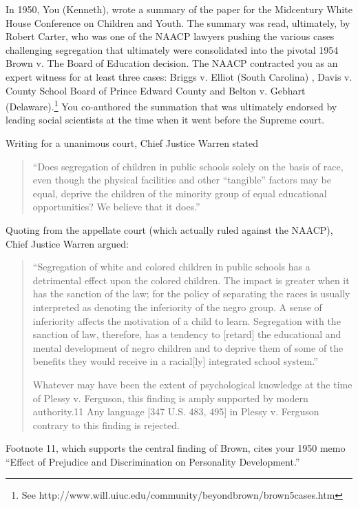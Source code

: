 \begin{refsection}
In 1950, You (Kenneth), wrote a summary of the paper for the Midcentury White House Conference on Children and Youth. The summary was read, ultimately, by Robert Carter, who was one of the NAACP lawyers pushing the various cases challenging segregation that ultimately were consolidated into the pivotal 1954 Brown v. The Board of Education decision. The NAACP contracted you as an expert witness for at least three cases: Briggs v. Elliot (South Carolina) , Davis v. County School Board of Prince Edward County and Belton v. Gebhart (Delaware).\footnote{See http:\slash \slash www.will.uiuc.edu\slash community\slash beyondbrown\slash brown5cases.htm} You co-authored the summation that was ultimately endorsed by leading social scientists at the time when it went before the Supreme court.

Writing for a unanimous court, Chief Justice Warren stated

\begin{quote}

“Does segregation of children in public schools solely on the basis of race, even though the physical facilities and other ``tangible'' factors may be equal, deprive the children of the minority group of equal educational opportunities? We believe that it does.”
\end{quote}

Quoting from the appellate court (which actually ruled against the NAACP), Chief Justice Warren argued:

\begin{quote}

``Segregation of white and colored children in public schools has a detrimental effect upon the colored children. The impact is greater when it has the sanction of the law; for the policy of separating the races is usually interpreted as denoting the inferiority of the negro group. A sense of inferiority affects the motivation of a child to learn. Segregation with the sanction of law, therefore, has a tendency to [retard] the educational and mental development of negro children and to deprive them of some of the benefits they would receive in a racial[ly] integrated school system.'' 

Whatever may have been the extent of psychological knowledge at the time of Plessy v. Ferguson, this finding is amply supported by modern authority.11 Any language [347 U.S. 483, 495] in Plessy v. Ferguson contrary to this finding is rejected.
\end{quote}

Footnote 11, which supports the central finding of Brown, cites your 1950 memo “Effect of Prejudice and Discrimination on Personality Development.”


\end{refsection}
